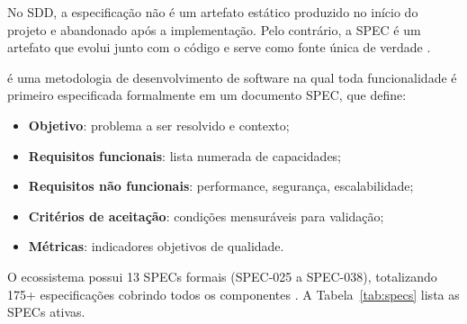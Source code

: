 No SDD, a especificação não é um artefato estático produzido no início
do projeto e abandonado após a implementação. Pelo contrário, a SPEC
é um artefato  que evolui junto com o código e serve como
fonte única de verdade \cite{wiegers1999software}.

\begin{definicao}
\sdd{} é uma metodologia de desenvolvimento de software na qual toda
funcionalidade é primeiro especificada formalmente em um documento
SPEC, que define:
\begin{itemize}
\item \textbf{Objetivo}: problema a ser resolvido e contexto;
\item \textbf{Requisitos funcionais}: lista numerada de capacidades;
\item \textbf{Requisitos não funcionais}: performance, segurança,
escalabilidade;
\item \textbf{Critérios de aceitação}: condições mensuráveis para
validação;
\item \textbf{Métricas}: indicadores objetivos de qualidade.
\end{itemize}
\end{definicao}

O ecossistema possui 13 SPECs formais (SPEC-025 a SPEC-038), totalizando
175+ especificações cobrindo todos os componentes
\cite{opencode2026ecosystem}. A Tabela~\ref{tab:specs} lista as SPECs
ativas.

\begin{table}[htb]
\centering
\caption{SPECs formais do OpenCode Ecosystem}
\label{tab:specs}
\small
\end{table}

